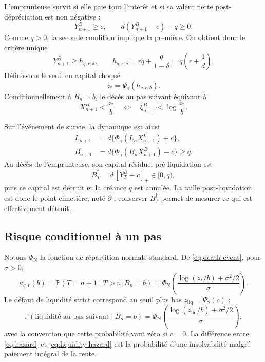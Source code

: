 \documentclass[11pt,a4paper]{article}
\newcommand{\Pp}{\mathbb P}
\newcommand{\1}{\mathbf 1}
\newcommand{\cim}{\dagger}
\theoremstyle{definition}
\theoremstyle{remark}
\begin{document}
L'emprunteuse survit si elle paie tout l'intérêt et si sa valeur nette
post-dépréciation est non négative :
\[
Y^B_{n+1}\geq c,\qquad
d(Y^B_{n+1}-c)-q\geq0.
\]
Comme $q>0$, la seconde condition implique la première. On obtient donc le
critère unique
\begin{equation}
\boxed{\quad
Y^B_{n+1}\geq h_{q,r,\delta},\qquad
h_{q,r,\delta}=rq+\frac{q}{1-\delta}
=q\left(r+\frac1d\right).
\quad}
\label{eq:survival-threshold}
\end{equation}
Définissons le seuil en capital choqué
\begin{equation}
z_*=\Psi_\gamma(h_{q,r,\delta}).
\label{eq:zstar}
\end{equation}
Conditionnellement à $B_n=b$, le décès au pas suivant équivaut à
\begin{equation}
X^B_{n+1}<\frac{z_*}{b}
\quad\Longleftrightarrow\quad
\xi^B_{n+1}<\log\frac{z_*}{b}.
\label{eq:death-event}
\end{equation}

Sur l'événement de survie, la dynamique est ainsi
\begin{equation}
\begin{split}
L_{n+1}&=d\{\Phi_\gamma(L_nX^L_{n+1})+c\},\\
B_{n+1}&=d\{\Phi_\gamma(B_nX^B_{n+1})-c\}\geq q.
\end{split}
\label{eq:alive-dynamics}
\end{equation}
Au décès de l'emprunteuse, son capital résiduel pré-liquidation est
\begin{equation}
B_{T}^{\cim}=d\,[Y^B_T-c]_+\in[0,q),
\label{eq:terminal-borrower}
\end{equation}
puis ce capital est détruit et la créance $q$ est annulée. La taille
post-liquidation est donc le point cimetière, noté $\partial$ ; conserver
$B_T^{\cim}$ permet de mesurer ce qui est effectivement détruit.

\subsection{Risque conditionnel à un pas}

Notons $\Phi_{\mathrm N}$ la fonction de répartition normale standard. De
\eqref{eq:death-event}, pour $\sigma>0$,
\begin{equation}
\boxed{\quad
\kappa_{q,r}(b)
=\Pp(T=n+1\mid T>n,B_n=b)
=\Phi_{\mathrm N}\!\left(
\frac{\log(z_*/b)+\sigma^2/2}{\sigma}
\right).
\quad}
\label{eq:hazard}
\end{equation}
Le défaut de liquidité strict correspond au seuil plus bas
$z_{\mathrm{liq}}=\Psi_\gamma(c)$ :
\begin{equation}
\Pp(\text{liquidité au pas suivant}\mid B_n=b)
=\Phi_{\mathrm N}\!\left(
\frac{\log(z_{\mathrm{liq}}/b)+\sigma^2/2}{\sigma}
\right),
\label{eq:liquidity-hazard}
\end{equation}
avec la convention que cette probabilité vaut zéro si $c=0$. La
différence entre \eqref{eq:hazard} et \eqref{eq:liquidity-hazard} est la
probabilité d'une insolvabilité malgré paiement intégral de la rente.
\end{document}
